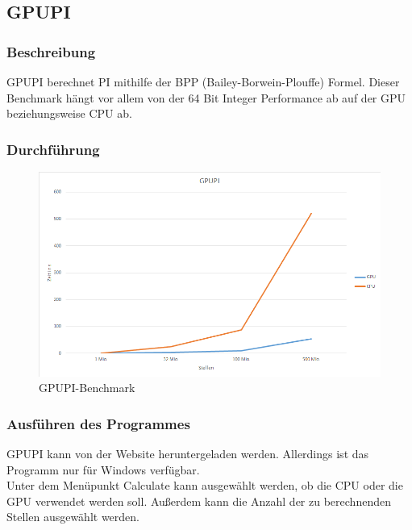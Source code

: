 \subsection{GPUPI}
\subsubsection{Beschreibung}
GPUPI berechnet PI mithilfe der BPP (Bailey-Borwein-Plouffe) Formel. Dieser Benchmark hängt vor allem von der 64 Bit Integer Performance ab auf der GPU beziehungsweise CPU ab.
\subsubsection{Durchführung}
\begin{figure}[!h]
	\begin{center}
		\includegraphics[width=17cm]{images/gpupi.png}
		\caption{GPUPI-Benchmark}
	\end{center}
\end{figure}
\subsubsection{Ausführen des Programmes}
GPUPI kann von der Website heruntergeladen werden. \cite{gpupi} Allerdings ist das Programm nur für Windows verfügbar.\\
Unter dem Menüpunkt Calculate kann ausgewählt werden, ob die CPU oder die GPU verwendet werden soll. Außerdem kann die Anzahl der zu berechnenden Stellen ausgewählt werden.